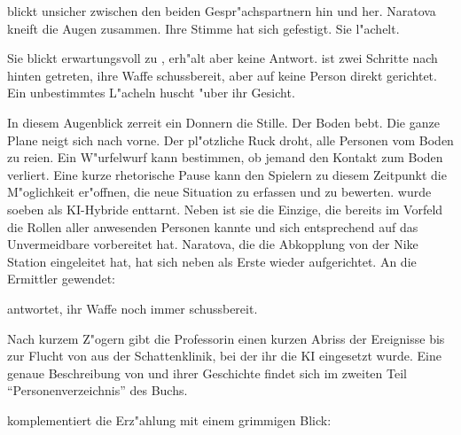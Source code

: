 
\ml{} blickt unsicher zwischen den beiden Gespr"achspartnern hin und her. Naratova kneift die Augen zusammen. Ihre Stimme hat sich gefestigt. Sie l"achelt.


Sie blickt erwartungsvoll zu \xl{}, erh"alt aber keine Antwort. \xl{} ist zwei Schritte nach hinten getreten, ihre Waffe schussbereit, aber auf keine Person direkt gerichtet. Ein unbestimmtes L"acheln huscht "uber ihr Gesicht.

In diesem Augenblick zerrei\3t ein Donnern die Stille. Der Boden bebt. Die ganze Plane neigt sich nach vorne. Der pl"otzliche Ruck droht, alle Personen vom Boden zu rei\3en. Ein W"urfelwurf kann bestimmen, ob jemand den Kontakt zum Boden verliert. Eine kurze rhetorische Pause kann den Spielern zu diesem Zeitpunkt die M"oglichkeit er"offnen, die neue Situation zu erfassen und zu bewerten. \xl{} wurde soeben als KI-Hybride enttarnt. Neben \ml{} ist sie die Einzige, die bereits im Vorfeld die Rollen aller anwesenden Personen kannte und sich entsprechend auf das Unvermeidbare vorbereitet hat. Naratova, die die Abkopplung von der Nike Station eingeleitet hat, hat sich neben \xl{} als Erste wieder aufgerichtet. An die Ermittler gewendet:


\xl{} antwortet, ihr Waffe noch immer schussbereit.


Nach kurzem Z"ogern gibt die Professorin einen kurzen Abriss der Ereignisse bis zur Flucht von \xl{} aus der Schattenklinik, bei der ihr die KI eingesetzt wurde. Eine genaue Beschreibung von \xl{} und ihrer Geschichte findet sich im zweiten Teil ``Personenverzeichnis'' des Buchs.

\xl{} komplementiert die Erz"ahlung mit einem grimmigen Blick:


